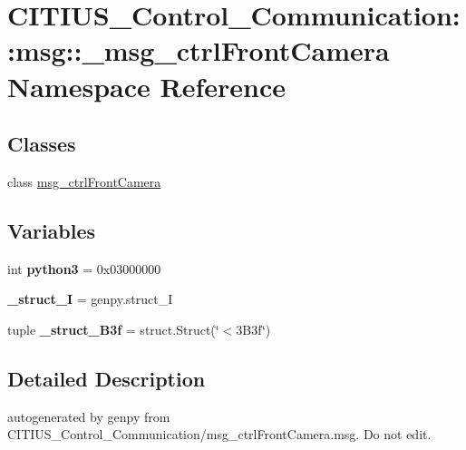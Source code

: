 \hypertarget{namespace_c_i_t_i_u_s___control___communication_1_1msg_1_1__msg__ctrl_front_camera}{\section{\-C\-I\-T\-I\-U\-S\-\_\-\-Control\-\_\-\-Communication\-:\-:msg\-:\-:\-\_\-msg\-\_\-ctrl\-Front\-Camera \-Namespace \-Reference}
\label{namespace_c_i_t_i_u_s___control___communication_1_1msg_1_1__msg__ctrl_front_camera}
}
\subsection*{\-Classes}
\begin{DoxyCompactItemize}
\item 
class \hyperlink{class_c_i_t_i_u_s___control___communication_1_1msg_1_1__msg__ctrl_front_camera_1_1msg__ctrl_front_camera}{msg\-\_\-ctrl\-Front\-Camera}
\end{DoxyCompactItemize}
\subsection*{\-Variables}
\begin{DoxyCompactItemize}
\item 
\hypertarget{namespace_c_i_t_i_u_s___control___communication_1_1msg_1_1__msg__ctrl_front_camera_ab6dd14d506db233f5399711f82f61f78}{int {\bfseries python3} = 0x03000000}\label{namespace_c_i_t_i_u_s___control___communication_1_1msg_1_1__msg__ctrl_front_camera_ab6dd14d506db233f5399711f82f61f78}

\item 
\hypertarget{namespace_c_i_t_i_u_s___control___communication_1_1msg_1_1__msg__ctrl_front_camera_a0611a58369abcd90bd59d835bd3bfaeb}{{\bfseries \-\_\-struct\-\_\-\-I} = genpy.\-struct\-\_\-\-I}\label{namespace_c_i_t_i_u_s___control___communication_1_1msg_1_1__msg__ctrl_front_camera_a0611a58369abcd90bd59d835bd3bfaeb}

\item 
\hypertarget{namespace_c_i_t_i_u_s___control___communication_1_1msg_1_1__msg__ctrl_front_camera_a107cddd81cad7fcb2e522cd355607225}{tuple {\bfseries \-\_\-struct\-\_\-B3f} = struct.\-Struct(\char`\"{}$<$3\-B3f\char`\"{})}\label{namespace_c_i_t_i_u_s___control___communication_1_1msg_1_1__msg__ctrl_front_camera_a107cddd81cad7fcb2e522cd355607225}

\end{DoxyCompactItemize}


\subsection{\-Detailed \-Description}
\begin{DoxyVerb}autogenerated by genpy from CITIUS_Control_Communication/msg_ctrlFrontCamera.msg. Do not edit.\end{DoxyVerb}
 